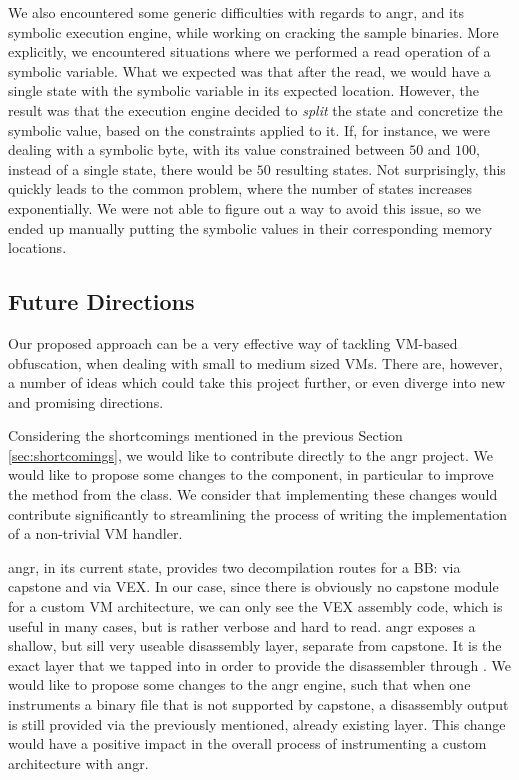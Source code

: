 We also encountered some generic difficulties with regards to angr, and its symbolic execution engine, while working on cracking the sample binaries. More explicitly, we encountered situations where we performed a read operation of a symbolic variable. What we expected was that after the read, we would have a single state with the symbolic variable in its expected location. However, the result was that the execution engine decided to \emph{split} the state and concretize the symbolic value, based on the constraints applied to it. If, for instance, we were dealing with a symbolic byte, with its value constrained between $50$ and $100$, instead of a single state, there would be $50$ resulting states. Not surprisingly, this quickly leads to the common problem, where the number of states increases exponentially. We were not able to figure out a way to avoid this issue, so we ended up manually putting the symbolic values in their corresponding memory locations.
\subsection{Future Directions}

Our proposed approach can be a very effective way of tackling \gls{VM}-based obfuscation, when dealing with small to medium sized \glspl{VM}. There are, however, a number of ideas which could take this project further, or even diverge into new and promising directions.

Considering the shortcomings mentioned in the previous Section \ref{sec:shortcomings}, we would like to contribute directly to the angr project. We would like to propose some changes to the  component, in particular to improve the  method from the  class. We consider that implementing these changes would contribute significantly to streamlining the process of writing the implementation of a non-trivial \gls{VM} handler.

angr, in its current state, provides two decompilation routes for a \gls{BB}: via capstone and via VEX. In our case, since there is obviously no capstone module for a custom \gls{VM} architecture, we can only see the VEX assembly code, which is useful in many cases, but is rather verbose and hard to read. angr exposes a shallow, but sill very useable disassembly layer, separate from capstone. It is the exact layer that we tapped into in order to provide the disassembler through . We would like to propose some changes to the angr engine, such that when one instruments a binary file that is not supported by capstone, a disassembly output is still provided via the previously mentioned, already existing layer. This change would have a positive impact in the overall process of instrumenting a custom architecture with angr.

